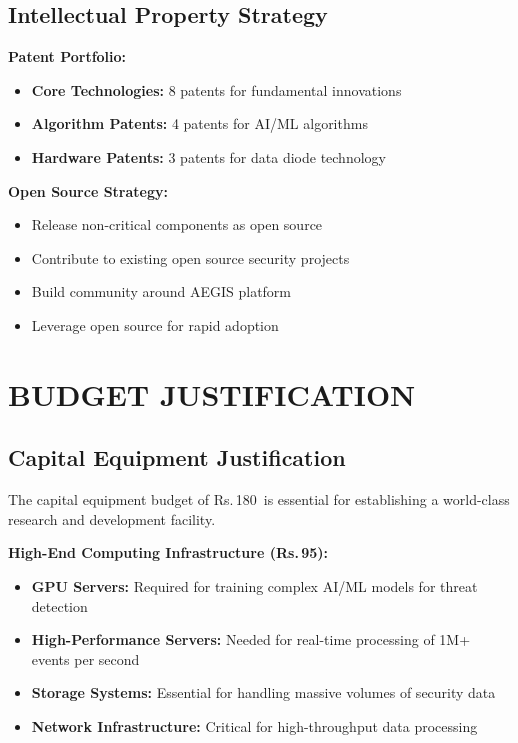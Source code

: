 \documentclass[12pt,a4paper]{article}
\newcommand{\rupees}{Rs.\,}
\newcommand{\lakhs}{\text{ Lakhs}}
\begin{document}
\subsection{Intellectual Property Strategy}

\textbf{Patent Portfolio:}
\begin{itemize}
    \item \textbf{Core Technologies:} 8 patents for fundamental innovations
    \item \textbf{Algorithm Patents:} 4 patents for AI/ML algorithms
    \item \textbf{Hardware Patents:} 3 patents for data diode technology
\end{itemize}

\textbf{Open Source Strategy:}
\begin{itemize}
    \item Release non-critical components as open source
    \item Contribute to existing open source security projects
    \item Build community around AEGIS platform
    \item Leverage open source for rapid adoption
\end{itemize}

\newpage

\section{BUDGET JUSTIFICATION}

\subsection{Capital Equipment Justification}

The capital equipment budget of \rupees 180\lakhs\ is essential for establishing a world-class research and development facility.

\textbf{High-End Computing Infrastructure (\rupees 95\lakhs):}
\begin{itemize}
    \item \textbf{GPU Servers:} Required for training complex AI/ML models for threat detection
    \item \textbf{High-Performance Servers:} Needed for real-time processing of 1M+ events per second
    \item \textbf{Storage Systems:} Essential for handling massive volumes of security data
    \item \textbf{Network Infrastructure:} Critical for high-throughput data processing
\end{itemize}
\end{document}
